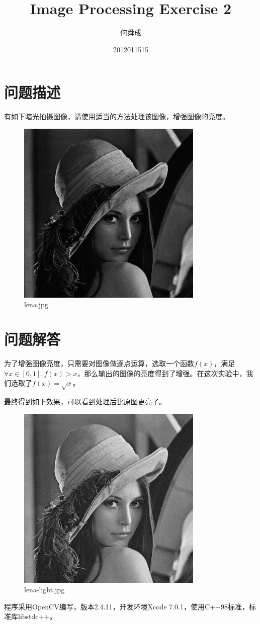 \documentclass[UTF8]{ctexart}
\author{何舜成}
\date{2012011515}
\title{Image Processing Exercise 2}
\begin{document}
\maketitle
\section{问题描述}
有如下暗光拍摄图像，请使用适当的方法处理该图像，增强图像的亮度。\par
\begin{figure}[htbp]
\centerline{\includegraphics[width=3.5in]{lena.jpg}}
\caption[]{lena.jpg}
\end{figure}
\section{问题解答}
为了增强图像亮度，只需要对图像做逐点运算，选取一个函数$f(x)$，满足$\forall x\in[0,1], f(x)>x$，那么输出的图像的亮度得到了增强。在这次实验中，我们选取了$f(x)=\sqrt{x}$。\par
最终得到如下效果，可以看到处理后比原图更亮了。\par
\begin{figure}[htbp]
\centerline{\includegraphics[width=3.5in]{lena-light.jpg}}
\caption[]{lena-light.jpg}
\end{figure}\par
程序采用OpenCV编写，版本2.4.11，开发环境Xcode 7.0.1，使用C++98标准，标准库libstdc++。
\end{document}
